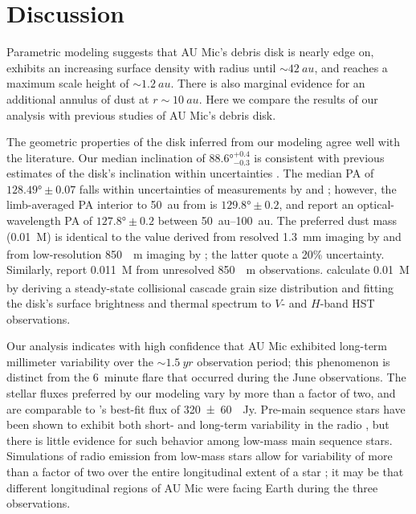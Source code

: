 \documentclass[12pt,oneside]{book}
\begin{document}
\clearpage
\chapter{Discussion}
\label{chapter: discussion}

Parametric modeling suggests that AU Mic's debris disk is nearly edge on, exhibits an increasing surface density with radius until $\sim\SI{42}{au}$, and reaches a maximum scale height of $\sim\SI{1.2}{au}$.
There is also marginal evidence for an additional annulus of dust at $r \sim \SI{10}{au}$.
Here we compare the results of our analysis with previous studies of AU Mic's debris disk.

The geometric properties of the disk inferred from our modeling agree well with the literature. 
Our median inclination of $\ang[angle-symbol-over-decimal]{88.6}^{+0.4}_{-0.3}$ is consistent with previous estimates of the disk's inclination within uncertainties \citep{metchev05,krist05}.
The median PA of $\ang[angle-symbol-over-decimal]{128.49} \pm 0.07$ falls within uncertainties of measurements by \cite{macgregor13} and \cite{krist05}; however, the limb-averaged PA interior to \SI{50}{au} from \cite{metchev05} is $\ang[angle-symbol-over-decimal]{129.8} \pm 0.2$, and \cite{schneider14} report an optical-wavelength PA of $\ang[angle-symbol-over-decimal]{127.8} \pm 0.2$ between \SIrange{50}{100}{au}.
The preferred dust mass (\SI{0.01}{M_\earth}) is identical to the value derived from resolved \SI{1.3}{mm} imaging by \cite{macgregor13} and from low-resolution \SI{850}{\mu m} imaging by \cite{matthews15}; the latter quote a 20\% uncertainty.
Similarly, \cite{liu04} report \SI{0.011}{M_\earth} from unresolved \SI{850}{\mu m} observations.
\cite{strubbe&chiang06} calculate \SI{0.01}{M_\earth} by deriving a steady-state collisional cascade grain size distribution and fitting the disk's surface brightness and thermal spectrum to $V$- and $H$-band HST observations.

Our analysis indicates with high confidence that AU Mic exhibited long-term millimeter variability over the $\sim \SI{1.5}{yr}$ observation period; this phenomenon is distinct from the \SI{6}{minute} flare that occurred during the June observations.
The stellar fluxes preferred by our modeling vary by more than a factor of two, and are comparable to \cite{macgregor13}'s best-fit flux of \SI{320 \pm 60}{\mu Jy}.
Pre-main sequence stars have been shown to exhibit both short- and long-term variability in the radio \citep{forbrich17,rivilla15}, but there is little evidence for such behavior among low-mass main sequence stars.
Simulations of radio emission from low-mass stars allow for variability of more than a factor of two over the entire longitudinal extent of a star \citep{llama18}; it may be that different longitudinal regions of AU Mic were facing Earth during the three observations.
\end{document}
